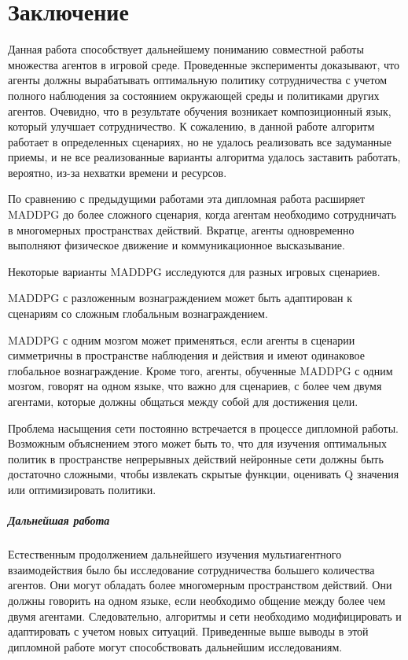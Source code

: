 \chapter*{Заключение} \label{ch-conclusion}

Данная работа способствует дальнейшему пониманию совместной работы множества агентов в игровой среде. Проведенные эксперименты доказывают, что агенты должны вырабатывать оптимальную политику сотрудничества с учетом полного наблюдения за состоянием окружающей среды и политиками других агентов. Очевидно, что в результате обучения возникает композиционный язык, который улучшает сотрудничество. К сожалению, в данной работе алгоритм работает в определенных сценариях, но не удалось реализовать все задуманные приемы, и не все реализованные варианты алгоритма удалось заставить работать, вероятно, из-за нехватки времени и ресурсов.

По сравнению с предыдущими работами эта дипломная работа расширяет MADDPG до более сложного сценария, когда агентам необходимо сотрудничать в многомерных пространствах действий. Вкратце, агенты одновременно выполняют физическое движение и коммуникационное высказывание.

Некоторые варианты MADDPG исследуются для разных игровых сценариев.

MADDPG с разложенным вознаграждением может быть адаптирован к сценариям со сложным глобальным вознаграждением.

MADDPG с одним мозгом может применяться, если агенты в сценарии симметричны в пространстве наблюдения и действия и имеют одинаковое глобальное вознаграждение. Кроме того, агенты, обученные MADDPG с одним мозгом, говорят на одном языке, что важно для сценариев, с более чем двумя агентами, которые должны общаться между собой для достижения цели.

Проблема насыщения сети постоянно встречается в процессе дипломной работы. Возможным объяснением этого может быть то, что для изучения оптимальных политик в пространстве непрерывных действий нейронные сети должны быть достаточно сложными, чтобы извлекать скрытые функции, оценивать Q значения или оптимизировать политики.

\paragraph{Дальнейшая работа}
Естественным продолжением дальнейшего изучения мультиагентного взаимодействия было бы исследование сотрудничества большего количества агентов. Они могут обладать более многомерным пространством действий. Они должны говорить на одном языке, если необходимо общение между более чем двумя агентами. Следовательно, алгоритмы и сети необходимо модифицировать и адаптировать с учетом новых ситуаций. Приведенные выше выводы в этой дипломной работе могут способствовать дальнейшим исследованиям.

